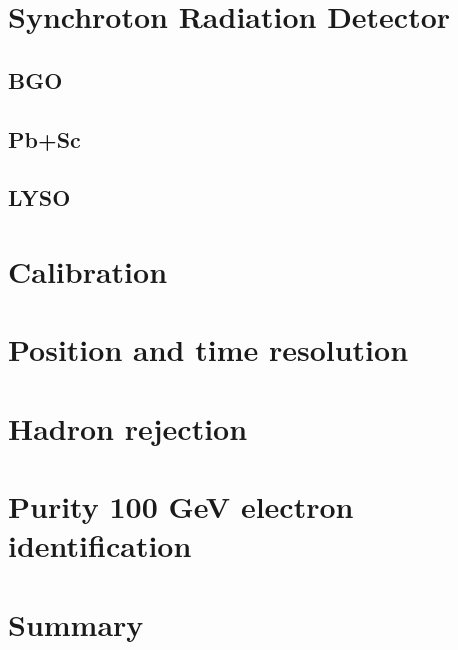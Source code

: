 \section{Synchroton Radiation Detector}
\subsection{BGO}
\subsection{Pb+Sc}
\subsection{LYSO}
\section{Calibration}
\section{Position and time resolution}
\section{Hadron rejection}
\section{Purity 100 GeV electron identification}
\section{Summary}


